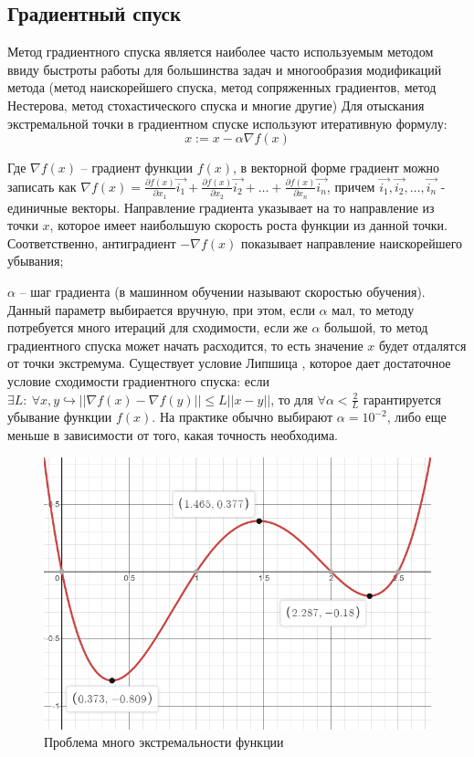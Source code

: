\subsection{Градиентный спуск}

Метод градиентного спуска является наиболее часто используемым методом ввиду быстроты работы для большинства задач и многообразия модификаций метода (метод наискорейшего спуска, метод сопряженных градиентов, метод Нестерова, метод стохастического спуска и многие другие)
Для отыскания экстремальной точки в градиентном спуске используют итеративную формулу:
$$ x := x - \alpha \nabla f(x) $$

Где $\nabla f(x)$ -- градиент функции $f(x)$, в векторной форме градиент можно записать как $\nabla f(x) = \frac{\partial f(x)}{\partial x_1} \vec{i_1} + \frac{\partial f(x)}{\partial x_2} \vec{i_2} + \dots + \frac{\partial f(x)}{\partial x_n} \vec{i_n}$, причем $\vec{i_1}, \vec{i_2}, \dots, \vec{i_n}$ - единичные векторы. Направление градиента указывает на то направление из точки $x$, которое имеет наибольшую скорость роста функции из данной точки. Соответственно, антиградиент $-\nabla f(x)$ показывает направление наискорейшего убывания;

$\alpha$ -- шаг градиента (в машинном обучении называют скоростью обучения). Данный параметр выбирается вручную, при этом, если $\alpha$ мал, то методу потребуется много итераций для сходимости, если же $\alpha$ большой, то метод градиентного спуска может начать расходится, то есть значение $x$ будет отдалятся от точки экстремума. Существует условие Липшица \cite{habr:grad_descent}, которое дает достаточное условие сходимости градиентного спуска: если $\exists L:~\forall x, y \hookrightarrow || \nabla f(x) - \nabla f(y) || \leq L || x - y ||$, то для $\forall \alpha < \frac{2}{L}$ гарантируется убывание функции $f(x)$. На практике обычно выбирают $\alpha=10^{-2}$, либо еще меньше в зависимости от того, какая точность необходима.

\begin{figure} 
    \vspace{-3ex}
    \includegraphics[width=\linewidth]{src/img/multi_extreme.png}
    \caption{Проблема много экстремальности функции}
    \label{fig:multi_extreme}
\end{figure}

